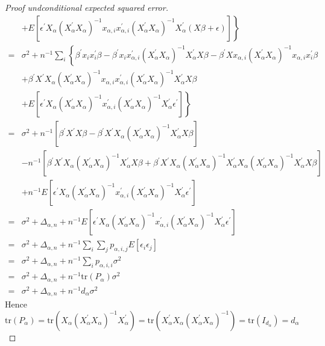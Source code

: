 \documentclass[Research_Module_ES.tex]{subfiles}
\begin{document}
\begin{proof}[Proof undconditional expected squared error]
\begin{align*}
		&+\left. E\left[\epsilon^\prime X_\alpha \left(X_\alpha^\prime X_\alpha\right)^{-1}x_{\alpha,i}x_{\alpha,i}^\prime \left(X_\alpha^\prime X_\alpha\right)^{-1} X_\alpha^\prime \left(X\beta +\epsilon\right) \right] \right\}\\
		=&\sigma^2 + n^{-1}\sum_i\left\{\beta^\prime x_ix_i^\prime\beta- \beta^\prime x_i x_{\alpha,i}^\prime 		\left(X_\alpha^\prime X_\alpha\right)^{-1} X_\alpha^\prime X\beta -\beta^\prime X x_{\alpha,i} \left(X_\alpha^\prime X_\alpha\right)^{-1}x_{\alpha,i}x_i^\prime \beta \right.\\
		&+\left.\beta^\prime X^\prime X_\alpha \left(X_\alpha^\prime X_\alpha\right)^{-1} x_{\alpha,i}x_{\alpha,i}^\prime \left(X_\alpha^\prime X_\alpha\right)^{-1} X_\alpha^\prime X\beta \right.\\ &+\left. E\left[\epsilon^\prime X_\alpha \left(X_\alpha^\prime X_\alpha\right)^{-1} x_{\alpha,i}^\prime \left(X_\alpha^\prime X_\alpha\right)^{-1} X_\alpha^\prime \epsilon^\prime \right]\right\}\\
		=&\sigma^2+ n^{-1}\left[\beta^\prime X^\prime X\beta-\beta^\prime X^\prime X_\alpha \left(X_\alpha^\prime X_\alpha\right)^{-1} X_\alpha^\prime X\beta \right]\\
		&-n^{-1}\left[\beta^\prime X^\prime X_\alpha \left(X_\alpha^\prime X_\alpha\right)^{-1} X_\alpha^\prime X\beta +\beta^\prime X^\prime X_\alpha \left(X_\alpha^\prime X_\alpha\right)^{-1} X_\alpha^\prime X_\alpha \left(X_\alpha^\prime X_\alpha\right)^{-1} X_\alpha^\prime X\beta\right]\\
		&+n^{-1}E\left[\epsilon^\prime X_\alpha \left(X_\alpha^\prime X_\alpha\right)^{-1} x_{\alpha,i}^\prime \left(X_\alpha^\prime X_\alpha\right)^{-1} X_\alpha^\prime \epsilon^\prime \right]\\
		=&\sigma^2+\Delta_{\alpha,n}+n^{-1}E\left[\epsilon^\prime X_\alpha \left(X_\alpha^\prime X_\alpha\right)^{-1} x_{\alpha,i}^\prime \left(X_\alpha^\prime X_\alpha\right)^{-1} X_\alpha^\prime \epsilon^\prime \right]\\
		=&\sigma^2+\Delta_{\alpha,n} + n^{-1}\sum_i\sum_j p_{\alpha,i,j}E\left[\epsilon_i\epsilon_j\right]\\
		=&\sigma^2+\Delta_{\alpha,n} + n^{-1}\sum_i p_{\alpha,i,i}\sigma^2\\
		=&\sigma^2+\Delta_{\alpha,n} + n^{-1}\text{tr}(P_\alpha)\sigma^2\\
		=&\sigma^2+\Delta_{\alpha,n} + n^{-1}d_\alpha\sigma^2
	\end{align*}
	Hence $\text{tr}(P_\alpha)=\text{tr}\left(X_\alpha \left(X_\alpha^\prime X_\alpha\right)^{-1} X_\alpha^\prime\right)=\text{tr}(X_\alpha^\prime X_\alpha \left(X_\alpha^\prime X_\alpha\right)^{-1})=\text{tr}(I_{d_\alpha})=d_\alpha $
\end{proof}
\end{document}
